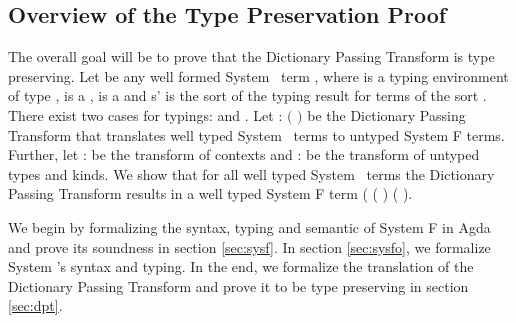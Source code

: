 \subsection{Overview of the Type Preservation Proof}
The overall goal will be to prove that the Dictionary Passing Transform is type preserving. Let  be any well formed System \Fo\ term    \Constr{:} , where  is a typing environment of type ,  is a  ,  is a   and s' is the sort of the typing result for terms of the sort . There exist two cases for typings:    \Constr{:}  and    \Constr{:} . Let  : $($   \Constr{:} $)$    be the Dictionary Passing Transform that translates well typed System \Fo\ terms to untyped System F terms. Further, let  :    be the transform of contexts and  :      be the transform of untyped types and kinds. We show that for all well typed System \Fo\  terms  the Dictionary Passing Transform results in a well typed System F term (   ( ) \Constr{:} ( ). 

\noindent We begin by formalizing the syntax, typing and semantic of System F in Agda and prove its soundness in section \ref{sec:sysf}. In section \ref{sec:sysfo}, we formalize System \Fo's syntax and typing. In the end, we formalize the translation of the Dictionary Passing Transform and prove it to be type preserving in section \ref{sec:dpt}.